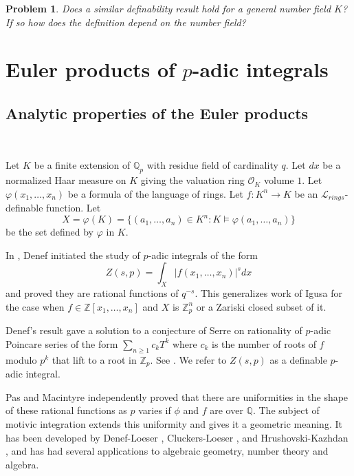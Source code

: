 \documentclass[12pt]{amsart}
\def\Z{\mathbb{Z}}
\def\cL{\mathcal{L}}
\def\Q{\mathbb{Q}}
\def\cL{\mathcal{L}}
\def\cO{\mathcal{O}}
\numberwithin{equation}{section}
\newtheorem{prob}{Problem}[section]
\begin{document}
\begin{prob} Does a similar definability result hold for a general number field $K$? If so how does the definition depend on the number field?\end{prob}

\medskip 

\section{\bf Euler products of $p$-adic integrals}\label{ssec-euler}

\subsection{\bf Analytic properties of the Euler products}

\

\medskip

Let $K$ be a finite extension of $\Q_p$ with residue field of cardinality $q$. Let $dx$ be a normalized Haar measure on $K$ giving the valuation ring $\cO_K$ volume $1$. 
Let $\varphi(x_1,\dots,x_n)$ be a formula of the language of rings. Let $f:K^n\rightarrow K$ be an $\cL_{rings}$-definable function. 
Let 
$$X=\varphi(K)=\{(a_1,\dots,a_n)\in K^n: K\models \varphi(a_1,\dots,a_n)\}$$ be the set defined by $\varphi$ in $K$. 

In \cite{Denefrationality}, Denef initiated the study of $p$-adic integrals of the form 
$$Z(s,p)=\int_{X} |f(x_1,\dots,x_n)|^s dx$$ and proved they are rational functions of $q^{-s}$. This generalizes work of Igusa for the case when $f \in \Z[x_1,\dots,x_n]$ and $X$ is $\Z_p^n$ or a Zariski closed subset of it.

Denef's result gave a solution to a conjecture of Serre on rationality of $p$-adic Poincare series of the form $\sum_{n\geq 1} c_kT^k$ where $c_k$ is the number of roots of $f$ modulo $p^k$ that lift to a root in $\Z_p$. See \cite{Denefrationality}. 
We refer to $Z(s,p)$ as a definable $p$-adic integral.

 Pas \cite{pas} and Macintyre \cite{Macintyre} independently proved that there are uniformities in the shape of these rational functions as $p$ varies if $\phi$ and $f$ are over $\Q$. 
The subject of motivic integration extends this uniformity and gives it a geometric meaning. It has been developed by Denef-Loeser \cite{DL}, Cluckers-Loeser \cite{CL2}, and Hrushovski-Kazhdan \cite{HK}, and has had several applications to algebraic geometry, number theory and algebra.
\end{document}
